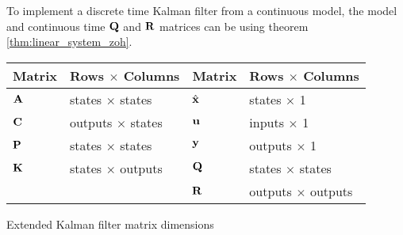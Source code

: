 \begin{remark}
  To implement a discrete time Kalman filter from a continuous model, the model
  and continuous time $\mathbf{Q}$ and $\mathbf{R}$ matrices can be
   using theorem
  \ref{thm:linear_system_zoh}.
\end{remark}
\begin{booktable}
  \begin{tabular}{|ll|ll|}
    \hline
    \rowcolor{headingbg}
    \textbf{Matrix} & \textbf{Rows $\times$ Columns} &
    \textbf{Matrix} & \textbf{Rows $\times$ Columns} \\
    \hline
    $\mathbf{A}$ & states $\times$ states & $\hat{\mathbf{x}}$ & states $\times$ 1 \\
    $\mathbf{C}$ & outputs $\times$ states & $\mathbf{u}$ & inputs $\times$ 1 \\
    $\mathbf{P}$ & states $\times$ states & $\mathbf{y}$ & outputs $\times$ 1 \\
    $\mathbf{K}$ & states $\times$ outputs & $\mathbf{Q}$ & states $\times$ states \\
              &                         & $\mathbf{R}$ & outputs $\times$ outputs \\
    \hline
  \end{tabular}
  \caption{Extended Kalman filter matrix dimensions}
\end{booktable}
